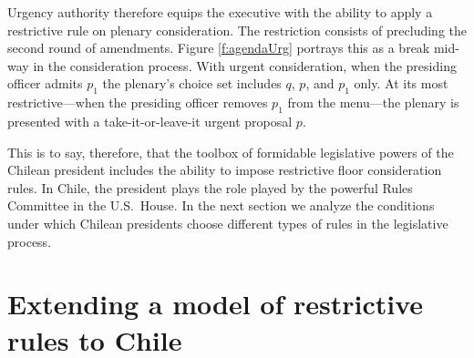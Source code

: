 \documentclass[letter,12pt]{article}
\begin{document}
Urgency authority therefore equips the executive with the ability to apply a restrictive rule on plenary consideration. The restriction consists of precluding the second round of amendments. Figure \ref{f:agendaUrg} portrays this as a break mid-way in the consideration process. With urgent consideration, when the presiding officer admits $p_1$ the plenary's choice set includes $q$, $p$, and $p_1$ only. At its most restrictive---when the presiding officer removes $p_1$ from the menu---the plenary is presented with a take-it-or-leave-it urgent proposal $p$.

This is to say, therefore, that the toolbox of formidable legislative powers of the Chilean president includes the ability to impose restrictive floor consideration rules. In Chile, the president plays the role played by the powerful Rules Committee in the U.S.\ House. In the next section we analyze the conditions under which  Chilean presidents choose different types of rules in the legislative process. 


\section{Extending a model of restrictive rules to Chile}
\end{document}
